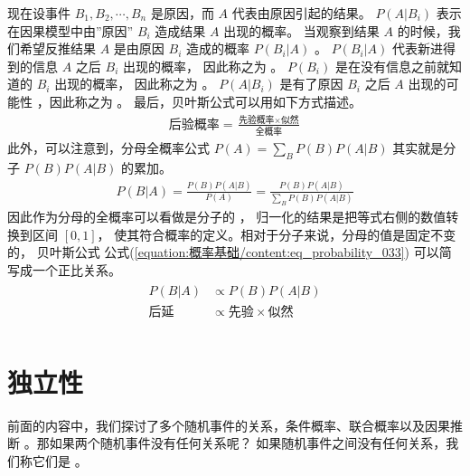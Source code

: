 \documentclass[letterpaper,10pt,english]{sphinxmanual}
\begin{document}
现在设事件 \(B_1,B_2,\cdots,B_n\) 是原因，而 \(A\) 代表由原因引起的结果。
\(P(A|B_i)\) 表示在因果模型中由”原因” \(B_i\) 造成结果 \(A\) 出现的概率。
当观察到结果 \(A\) 的时候，我们希望反推结果 \(A\) 是由原因 \(B_i\) 造成的概率 \(P(B_i|A)\) 。
\(P(B_i|A)\) 代表新进得到的信息 \(A\) 之后 \(B_i\) 出现的概率，
因此称之为 。
\(P(B_i)\) 是在没有信息之前就知道的 \(B_i\) 出现的概率，
因此称之为 。
\(P(A|B_i)\) 是有了原因 \(B_i\) 之后 \(A\) 出现的可能性
，因此称之为 。
最后，贝叶斯公式可以用如下方式描述。
\begin{equation}\label{equation:概率基础/content:概率基础/content:21}
\begin{split}\text{后验概率} = \frac{\text{先验概率} \times \text{似然} }{\text{全概率}}\end{split}
\end{equation}
此外，可以注意到，分母全概率公式 \(P(A)=\sum_B  P(B)P(A|B)\) 其实就是分子 \(P(B)P(A|B)\)
的累加。
\begin{equation}\label{equation:概率基础/content:eq_probability_033}
\begin{split}P(B|A) = \frac{P(B)P(A|B)}{P(A)} =  \frac{P(B)P(A|B)}{\sum_B  P(B)P(A|B) }\end{split}
\end{equation}
因此作为分母的全概率可以看做是分子的 ，
归一化的结果是把等式右侧的数值转换到区间 \([0,1]\)，
使其符合概率的定义。相对于分子来说，分母的值是固定不变的，
贝叶斯公式 公式(\ref{equation:概率基础/content:eq_probability_033}) 可以简写成一个正比关系。
\begin{align}\label{equation:概率基础/content:eq_probability_035}\!\begin{aligned}
P(B|A) &\propto P(B) P(A|B)\\
\text{后延}  &\propto \text{先验} \times \text{似然}\\
\end{aligned}\end{align}

\section{独立性}
\label{\detokenize{_u6982_u7387_u57fa_u7840/content:id9}}
前面的内容中，我们探讨了多个随机事件的关系，条件概率、联合概率以及因果推断
。那如果两个随机事件没有任何关系呢？
如果随机事件之间没有任何关系，我们称它们是 。
\end{document}
